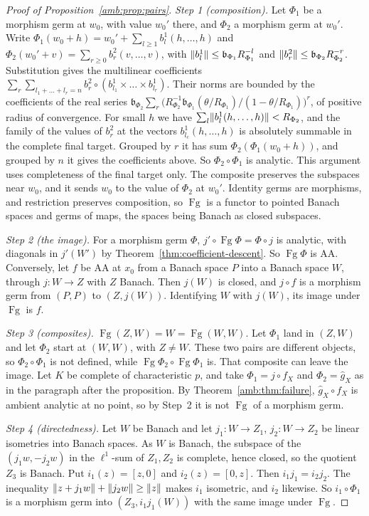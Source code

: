 \begin{proof}[Proof of Proposition~\ref{amb:prop:pairs}]
\emph{Step 1 (composition).} Let $\Phi_1$ be a morphism germ at $w_0$, with value $w_0'$ there, and $\Phi_2$ a morphism germ at $w_0'$. Write $\Phi_1(w_0+h)=w_0'+\sum_{l\ge1}b^1_l(h,\dots,h)$ and $\Phi_2(w_0'+v)=\sum_{r\ge0}b^2_r(v,\dots,v)$, with $\lVert b^1_l\rVert\le \mathfrak b_{\Phi_1}R_{\Phi_1}^{-l}$ and $\lVert b^2_r\rVert\le \mathfrak b_{\Phi_2}R_{\Phi_2}^{-r}$. Substitution gives the multilinear coefficients $\sum_r\sum_{l_1+\dots+l_r=n}b^2_r\circ(b^1_{l_1}\times\dots\times b^1_{l_r})$. Their norms are bounded by the coefficients of the real series $\mathfrak b_{\Phi_2}\sum_r\bigl(R_{\Phi_2}^{-1}\mathfrak b_{\Phi_1}(\theta/R_{\Phi_1})/(1-\theta/R_{\Phi_1})\bigr)^r$, of positive radius of convergence. For small $h$ we have $\sum_l\lVert b^1_l(h,\dots,h)\rVert<R_{\Phi_2}$, and the family of the values of $b^2_r$ at the vectors $b^1_{l_c}(h,\dots,h)$ is absolutely summable in the complete final target. Grouped by $r$ it has sum $\Phi_2(\Phi_1(w_0+h))$, and grouped by $n$ it gives the coefficients above. So $\Phi_2\circ\Phi_1$ is analytic. This argument uses completeness of the final target only. The composite preserves the subspaces near $w_0$, and it sends $w_0$ to the value of $\Phi_2$ at $w_0'$. Identity germs are morphisms, and restriction preserves composition, so $\operatorname{Fg}$ is a functor to pointed Banach spaces and germs of maps, the spaces being Banach as closed subspaces.

\emph{Step 2 (the image).} For a morphism germ $\Phi$, $j'\circ\operatorname{Fg}\Phi=\Phi\circ j$ is analytic, with diagonals in $j'(W')$ by Theorem~\ref{thm:coefficient-descent}. So $\operatorname{Fg}\Phi$ is AA. Conversely, let $f$ be AA at $x_0$ from a Banach space $P$ into a Banach space $W$, through $j\colon W\to Z$ with $Z$ Banach. Then $j(W)$ is closed, and $j\circ f$ is a morphism germ from $(P,P)$ to $(Z,j(W))$. Identifying $W$ with $j(W)$, its image under $\operatorname{Fg}$ is $f$.

\emph{Step 3 (composites).} $\operatorname{Fg}(Z,W)=W=\operatorname{Fg}(W,W)$. Let $\Phi_1$ land in $(Z,W)$ and let $\Phi_2$ start at $(W,W)$, with $Z\ne W$. These two pairs are different objects, so $\Phi_2\circ\Phi_1$ is not defined, while $\operatorname{Fg}\Phi_2\circ\operatorname{Fg}\Phi_1$ is. That composite can leave the image. Let $K$ be complete of characteristic $p$, and take $\Phi_1=j\circ f_X$ and $\Phi_2=\hat g_X$ as in the paragraph after the proposition. By Theorem~\ref{amb:thm:failure}, $\hat g_X\circ f_X$ is ambient analytic at no point, so by Step~2 it is not $\operatorname{Fg}$ of a morphism germ.

\emph{Step 4 (directedness).} Let $W$ be Banach and let $j_1\colon W\to Z_1$, $j_2\colon W\to Z_2$ be linear isometries into Banach spaces. As $W$ is Banach, the subspace of the $(j_1w,-j_2w)$ in the $\ell^1$-sum of $Z_1,Z_2$ is complete, hence closed, so the quotient $Z_3$ is Banach. Put $i_1(z)=[z,0]$ and $i_2(z)=[0,z]$. Then $i_1j_1=i_2j_2$. The inequality $\lVert z+j_1w\rVert+\lVert j_2w\rVert\ge\lVert z\rVert$ makes $i_1$ isometric, and $i_2$ likewise. So $i_1\circ\Phi_1$ is a morphism germ into $(Z_3,i_1j_1(W))$ with the same image under $\operatorname{Fg}$.
\end{proof}

